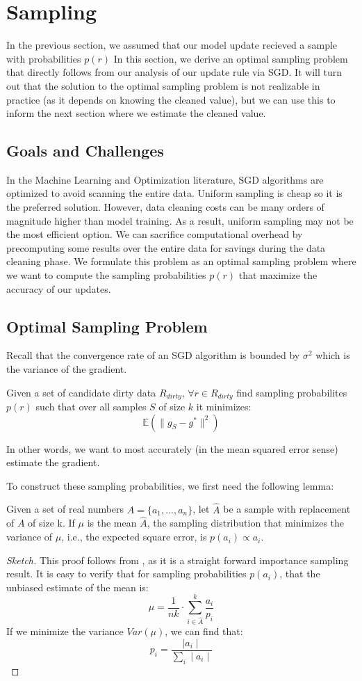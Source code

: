 \section{Sampling}\label{dist-samp}
In the previous section, we assumed that our model update recieved a sample with probabilities $p(r)$
In this section, we derive an optimal sampling problem that directly follows from our analysis of our update rule via SGD.
It will turn out that the solution to the optimal sampling problem is not realizable in practice (as it depends on knowing the cleaned value), but we can use this to inform the next section where we estimate the cleaned value.

\subsection{Goals and Challenges}
In the Machine Learning and Optimization literature, SGD algorithms are optimized to avoid scanning the entire data.
Uniform sampling is cheap so it is the preferred solution.
However, data cleaning costs can be many orders of magnitude higher than model training.
As a result, uniform sampling may not be the most efficient option.
We can sacrifice computational overhead by precomputing some results over the entire data for savings during the data cleaning phase.
We formulate this problem as an optimal sampling problem where we want to compute the sampling probabilities $p(r)$ that maximize the accuracy of our updates.

\subsection{Optimal Sampling Problem}
Recall that the convergence rate of an SGD algorithm is bounded by $\sigma^2$ which is the variance of the gradient.
\begin{definition}
Given a set of candidate dirty data $R_{dirty}$, $\forall r \in R_{dirty}$ find sampling probabilites $p(r)$ such that over all samples $S$ of size $k$ it minimizes:
\[
\mathbb{E}(\|g_S - g^*\|^2)
\]
\end{definition}
In other words, we want to most accurately (in the mean squared error sense) estimate the gradient.

To construct these sampling probabilities, we first need the following lemma:
\begin{lemma}\label{impsample}
Given a set of real numbers $A = \{a_1,...,a_n\}$, let $\hat{A}$ be 
a sample with replacement of $A$ of size k.
If $\mu$ is the mean $\hat{A}$, the sampling distribution that minimizes
 the variance of $\mu$, i.e., the expected square error, is $p(a_i) \propto a_i$.
\end{lemma}
\begin{proof}[Sketch]
This proof follows from \cite{mcbook}, as it is a straight forward importance sampling result.
It is easy to verify that for sampling probabilities $p(a_i)$, that the unbiased
estimate of the mean is:
\[
\mu = \frac{1}{nk}\cdot\sum_{i\in\hat{A}}^k \frac{a_i}{p_i}
\]
If we minimize the variance $Var(\mu)$, we can find that:
\[
p_i = \frac{\mid a_i \mid }{\sum_i \mid a_i \mid}
\]
\end{proof}

